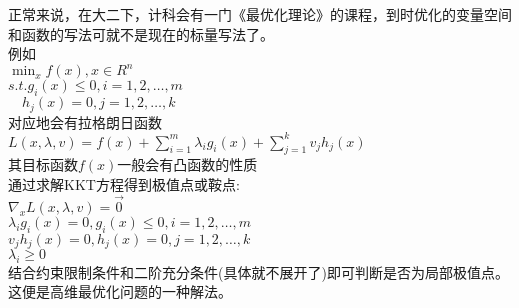 \begin{frame}
	正常来说，在大二下，计科会有一门《最优化理论》的课程，到时优化的变量空间和函数的写法可就不是现在的标量写法了。\\
	例如\\
	$\min_x f(x),x\in R^n$\\
	$s.t. g_i(x)\leq0,i=1,2,\dots,m$\\
	$\quad h_j(x)=0,j=1,2,\dots,k$\\
	对应地会有拉格朗日函数$L(x,\lambda,v)=f(x)+\sum_{i=1}^{m}\lambda_ig_i(x)+\sum_{j=1}^{k}v_jh_j(x)$\\
	其目标函数$f(x)$一般会有凸函数的性质\\
	通过求解KKT方程得到极值点或鞍点:\\
	$\nabla_x L(x,\lambda, v)=\vec 0$\\
	$\lambda_ig_i(x)=0,g_i(x)\leq0,i=1,2,\dots,m$\\
	$v_jh_j(x)=0,h_j(x)=0,j=1,2,\dots,k$\\
	$\lambda_i\geq0$\\
	结合约束限制条件和二阶充分条件(具体就不展开了)即可判断是否为局部极值点。这便是高维最优化问题的一种解法。
	
\end{frame}

